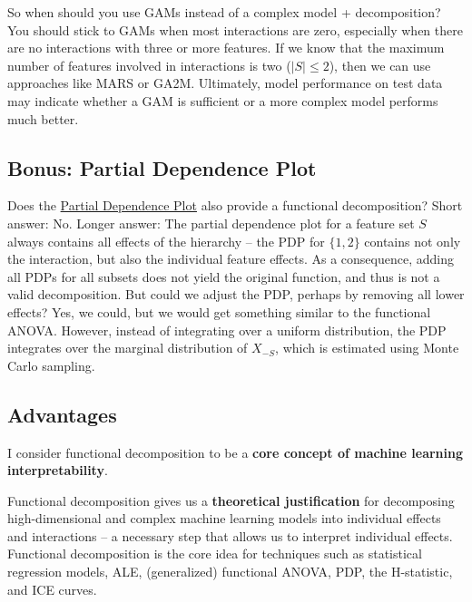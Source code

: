 \documentclass[
  11pt,
]{scrbook}
\begin{document}
So when should you use GAMs instead of a complex model + decomposition?
You should stick to GAMs when most interactions are zero, especially when there are no interactions with three or more features.
If we know that the maximum number of features involved in interactions is two (\(|S|\leq{}2\)), then we can use approaches like MARS or GA2M.
Ultimately, model performance on test data may indicate whether a GAM is sufficient or a more complex model performs much better.

\hypertarget{bonus-partial-dependence-plot}{%
\subsection{Bonus: Partial Dependence Plot}\label{bonus-partial-dependence-plot}}

Does the \protect\hyperlink{pdp}{Partial Dependence Plot} also provide a functional decomposition?
Short answer: No.
Longer answer:
The partial dependence plot for a feature set \(S\) always contains all effects of the hierarchy -- the PDP for \(\{1,2\}\) contains not only the interaction, but also the individual feature effects.
As a consequence, adding all PDPs for all subsets does not yield the original function, and thus is not a valid decomposition.
But could we adjust the PDP, perhaps by removing all lower effects?
Yes, we could, but we would get something similar to the functional ANOVA.
However, instead of integrating over a uniform distribution, the PDP integrates over the marginal distribution of \(X_{-S}\), which is estimated using Monte Carlo sampling.

\hypertarget{advantages-8}{%
\subsection{Advantages}\label{advantages-8}}

I consider functional decomposition to be a \textbf{core concept of machine learning interpretability}.

Functional decomposition gives us a \textbf{theoretical justification} for decomposing high-dimensional and complex machine learning models into individual effects and interactions -- a necessary step that allows us to interpret individual effects.
Functional decomposition is the core idea for techniques such as statistical regression models, ALE, (generalized) functional ANOVA, PDP, the H-statistic, and ICE curves.
\end{document}
